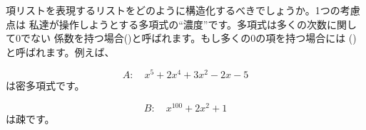 項リストを表現するリストをどのように構造化するべきでしょうか。1つの考慮点は
私達が操作しようとする多項式の``濃度''です。多項式は多くの次数に関して0でない
係数を持つ場合()と呼ばれます。もし多くの0の項を持つ場合には
()と呼ばれます。例えば、
\begin{comment}

\begin{example}
A : x^5 + 2x^4 + 3x^2 - 2x - 5
\end{example}

\end{comment}
\begin{displaymath}
 A: \quad x^5 + 2x^4 + 3x^2 - 2x - 5 
\end{displaymath}
\noindent
は密多項式です。
\begin{comment}

\begin{example}
B : x^100 + 2x^2 + 1
\end{example}

\end{comment}
\begin{displaymath}
 B: \quad x^{100} + 2x^2 + 1 
\end{displaymath}
\noindent
は疎です。


